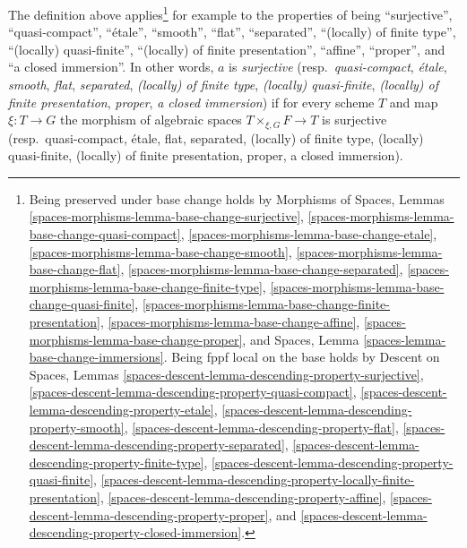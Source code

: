 \medskip\noindent
The definition above applies\footnote{Being preserved under base
change holds by
Morphisms of Spaces, Lemmas
\ref{spaces-morphisms-lemma-base-change-surjective},
\ref{spaces-morphisms-lemma-base-change-quasi-compact},
\ref{spaces-morphisms-lemma-base-change-etale},
\ref{spaces-morphisms-lemma-base-change-smooth},
\ref{spaces-morphisms-lemma-base-change-flat},
\ref{spaces-morphisms-lemma-base-change-separated},
\ref{spaces-morphisms-lemma-base-change-finite-type},
\ref{spaces-morphisms-lemma-base-change-quasi-finite},
\ref{spaces-morphisms-lemma-base-change-finite-presentation},
\ref{spaces-morphisms-lemma-base-change-affine},
\ref{spaces-morphisms-lemma-base-change-proper}, and
Spaces, Lemma
\ref{spaces-lemma-base-change-immersions}.
Being fppf local on the base holds by
Descent on Spaces, Lemmas
\ref{spaces-descent-lemma-descending-property-surjective},
\ref{spaces-descent-lemma-descending-property-quasi-compact},
\ref{spaces-descent-lemma-descending-property-etale},
\ref{spaces-descent-lemma-descending-property-smooth},
\ref{spaces-descent-lemma-descending-property-flat},
\ref{spaces-descent-lemma-descending-property-separated},
\ref{spaces-descent-lemma-descending-property-finite-type},
\ref{spaces-descent-lemma-descending-property-quasi-finite},
\ref{spaces-descent-lemma-descending-property-locally-finite-presentation},
\ref{spaces-descent-lemma-descending-property-affine},
\ref{spaces-descent-lemma-descending-property-proper}, and
\ref{spaces-descent-lemma-descending-property-closed-immersion}.
}
for example to the properties of being
``surjective'',
``quasi-compact'',
``\'etale'',
``smooth'',
``flat'',
``separated'',
``(locally) of finite type'',
``(locally) quasi-finite'',
``(locally) of finite presentation'',
``affine'',
``proper'', and
``a closed immersion''.
In other words, $a$ is
{\it surjective}
(resp.\ {\it quasi-compact},
{\it \'etale},
{\it smooth},
{\it flat},
{\it separated},
{\it (locally) of finite type},
{\it (locally) quasi-finite},
{\it (locally) of finite presentation},
{\it proper},
{\it a closed immersion})
if for every scheme $T$ and map $\xi : T \to G$
the morphism of algebraic spaces $T \times_{\xi, G} F \to T$ is
surjective
(resp.\ quasi-compact,
\'etale,
flat,
separated,
(locally) of finite type,
(locally) quasi-finite,
(locally) of finite presentation,
proper,
a closed immersion).

